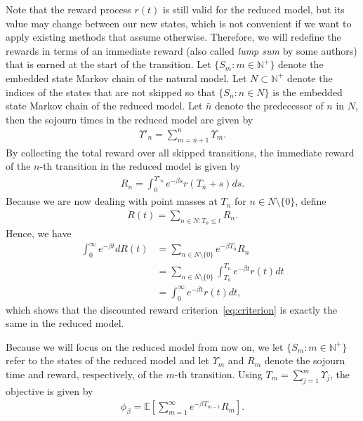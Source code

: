 \documentclass{article}
\theoremstyle{definition}
\theoremstyle{plain}
\begin{document}
Note that the reward process $r(t)$ is still valid for the reduced model, but
its value may change between our new states, which is not convenient if we want
to apply existing methods that assume otherwise. Therefore, we will redefine the
rewards in terms of an immediate reward (also called \textit{lump sum} by some
authors) that is earned at the start of the transition.
%
Let $\{S_{m} : m \in \mathbb{N}^{+} \}$ denote the embedded state Markov chain
of the natural model. Let $N \subset \mathbb{N}^{+}$ denote the indices of the
states that are not skipped so that $\{S_{n} : n \in N \}$ is the embedded state
Markov chain of the reduced model. Let $\bar{n}$ denote the predecessor of
$n$ in $N$, then the sojourn times in the reduced model are given by
\begin{align}
  \Upsilon'_{n} = \sum_{m=\bar{n} + 1}^{n} \Upsilon_{m} .
\end{align}
%
By collecting the total reward over all skipped transitions, the immediate
reward of the $n$-th transition in the reduced model is given by
\begin{align}
  R_{n} = \int_{0}^{\Upsilon'_{n}} e^{- \beta s} r(T_{\bar{n}} + s) ds .
\end{align}
Because we are now dealing with point masses at $T_{n}$ for $n \in N \setminus \{ 0 \}$, define
\begin{align}
        R(t) = \sum_{n \in N : T_{\bar{n}} \leq t} R_{n} .
\end{align}
Hence, we have
\begin{subequations}
\begin{align}
  \int_{0}^{\infty} e^{- \beta t} d R(t) &= \sum_{n \in N \setminus \{ 0 \}} e^{- \beta T_{\bar{n}}} R_{n} \\
   &= \sum_{n \in N \setminus \{ 0 \}} \int_{T_{\bar{n}}}^{T_{n}} e^{- \beta t} r(t) dt \\
   &= \int_{0}^{\infty} e^{-\beta t} r(t) dt ,
\end{align}
\end{subequations}
which shows that the discounted reward criterion~\eqref{eq:criterion} is exactly the same in the
reduced model.

Because we will focus on the reduced model from now on, we let
$\{ S_{m} : m \in \mathbb{N}^{+} \}$ refer to the states of the reduced model
and let $\Upsilon_{m}$ and $R_{m}$ denote the sojourn time and reward,
respectively, of the $m$-th transition. Using
$T_{m} = \sum_{j=1}^{m} \Upsilon_{j}$, the objective is given by
\begin{align}
  \phi_{\beta} = \mathbb{E} \left[ \sum_{m=1}^{\infty} e^{- \beta T_{m-1}} R_{m} \right] .
\end{align}
\end{document}
